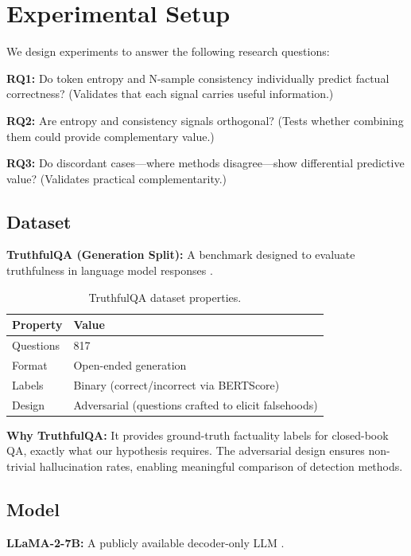 \section{Experimental Setup}
\label{sec:experiments}

We design experiments to answer the following research questions:

\textbf{RQ1:} Do token entropy and N-sample consistency individually predict factual correctness? (Validates that each signal carries useful information.)

\textbf{RQ2:} Are entropy and consistency signals orthogonal? (Tests whether combining them could provide complementary value.)

\textbf{RQ3:} Do discordant cases---where methods disagree---show differential predictive value? (Validates practical complementarity.)

\subsection{Dataset}

\textbf{TruthfulQA (Generation Split):} A benchmark designed to evaluate truthfulness in language model responses \citep{lin2022truthfulqa}.

\begin{table}[h]
\centering
\begin{tabular}{@{}ll@{}}
\toprule
Property & Value \\
\midrule
Questions & 817 \\
Format & Open-ended generation \\
Labels & Binary (correct/incorrect via BERTScore) \\
Design & Adversarial (questions crafted to elicit falsehoods) \\
\bottomrule
\end{tabular}
\caption{TruthfulQA dataset properties.}
\label{tab:dataset}
\end{table}

\textbf{Why TruthfulQA:} It provides ground-truth factuality labels for closed-book QA, exactly what our hypothesis requires. The adversarial design ensures non-trivial hallucination rates, enabling meaningful comparison of detection methods.

\subsection{Model}

\textbf{LLaMA-2-7B:} A publicly available decoder-only LLM \citep{touvron2023llama}.

